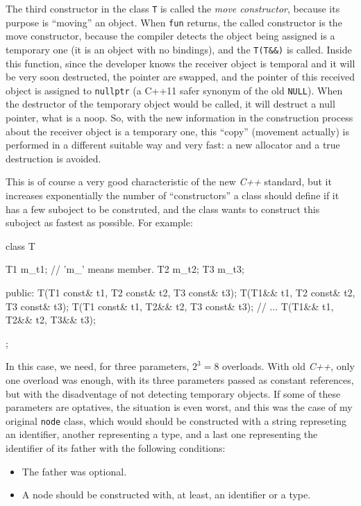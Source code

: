 \documentclass{article}
\begin{document}
The third constructor in the class \texttt{T} is called the \textit{move
  constructor}, because its purpose is ``moving'' an object. When \texttt{fun}
returns, the called constructor is the move constructor, because the compiler
detects the object being assigned is a temporary one (it is an object with no
bindings), and the \texttt{T(T\&\&)} is called. Inside this function, since the
developer knows the receiver object is temporal and it will be very soon
destructed, the pointer are swapped, and the pointer of this received object is
assigned to \texttt{nullptr} (a C++11 safer synonym of the old
\texttt{NULL}). When the destructor of the temporary object would be called, it
will destruct a null pointer, what is a noop. So, with the new information in
the construction process about the receiver object is a temporary one, this
``copy'' (movement actually) is performed in a different suitable way and very
fast: a new allocator and a true destruction is avoided.

This is of course a very good characteristic of the new \textit{C++} standard, but
it increases exponentially the number of ``constructors'' a class should define
if it has a few suboject to be construted, and the class wants to construct this
suboject as fastest as possible. For example:

\begin{Cpp}
  class T {
     T1 m_t1; // 'm_' means member.
     T2 m_t2;
     T3 m_t3;

  public:
      T(T1 const& t1, T2 const& t2, T3 const& t3);
      T(T1&& t1, T2 const& t2, T3 const& t3);
      T(T1 const& t1, T2&& t2, T3 const& t3);
      // ...
      T(T1&& t1, T2&& t2, T3&& t3);
  };
\end{Cpp}

In this case, we need, for three parameters, $2^3 = 8$ overloads. With old
\textit{C++}, only one overload was enough, with its three parameters passed as
constant references, but with the disadventage of not detecting temporary
objects. If some of these parameters are optatives, the situation is even worst,
and this was the case of my original \texttt{node} class, which would should be
constructed with a string represeting an identifier, another representing a
type, and a last one representing the identifier of its father with the
following conditions:

\begin{itemize}
\item The father was optional.
\item A node should be constructed with, at least, an identifier or a type.
\end{itemize}
\end{document}
